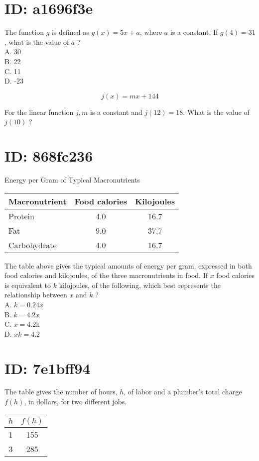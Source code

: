 \section*{ID: a1696f3e}
The function $g$ is defined as $g(x)=5 x+a$, where $a$ is a constant. If $g(4)=31$, what is the value of $a$ ?\\
A. 30\\
B. 22\\
C. 11\\
D. -23

$$
j(x)=m x+144
$$

For the linear function $j, m$ is a constant and $j(12)=18$. What is the value of $j(10)$ ?

\section*{ID: 868fc236}
Energy per Gram of Typical Macronutrients

\begin{center}
\begin{tabular}{|l|c|c|}
\hline
Macronutrient & Food calories & Kilojoules \\
\hline
Protein & 4.0 & 16.7 \\
\hline
Fat & 9.0 & 37.7 \\
\hline
Carbohydrate & 4.0 & 16.7 \\
\hline
\end{tabular}
\end{center}

The table above gives the typical amounts of energy per gram, expressed in both food calories and kilojoules, of the three macronutrients in food. If $x$ food calories is equivalent to $k$ kilojoules, of the following, which best represents the relationship between $x$ and $k$ ?\\
A. $k=0.24 x$\\
B. $k=4.2 x$\\
C. $x=4.2 \mathrm{k}$\\
D. $x k=4.2$

\section*{ID: 7e1bff94}
The table gives the number of hours, $h$, of labor and a plumber's total charge $f(h)$, in dollars, for two different jobs.

\begin{center}
\begin{tabular}{|c|c|}
\hline
$h$ & $f(h)$ \\
\hline
1 & 155 \\
\hline
3 & 285 \\
\hline
\end{tabular}
\end{center}

